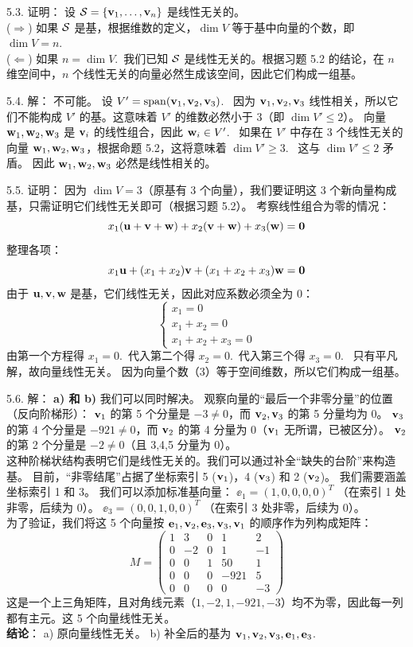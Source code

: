 \begin{exer}
5.3. 证明：
设 $\mathcal{S}  = \{\mathbf{v}_1, \dots, \mathbf{v}_n\}$ 是线性无关的。
\\
($\Rightarrow$) 如果 $\mathcal{S} $ 是基，根据维数的定义，$\dim V$ 等于基中向量的个数，即 $\dim V = n$.~
\\
($\Leftarrow$) 如果 $n = \dim V$.~我们已知 $\mathcal{S} $ 是线性无关的。根据习题 5.2 的结论，在 $n$ 维空间中，$n$ 个线性无关的向量必然生成该空间，因此它们构成一组基。

5.4. 解：
不可能。
设 $V' = \operatorname{span}(\mathbf{v}_1, \mathbf{v}_2, \mathbf{v}_3)$.~
因为 $\mathbf{v}_1, \mathbf{v}_2, \mathbf{v}_3$ 线性相关，所以它们不能构成 $V'$ 的基。这意味着 $V'$ 的维数必然小于 3（即 $\dim V' \le 2$）。
向量 $\mathbf{w}_1, \mathbf{w}_2, \mathbf{w}_3$ 是 $\mathbf{v}_i$ 的线性组合，因此 $\mathbf{w}_i \in V'$.~
如果在 $V'$ 中存在 3 个线性无关的向量 $\mathbf{w}_1, \mathbf{w}_2, \mathbf{w}_3$，根据命题 5.2，这将意味着 $\dim V' \ge 3$.~
这与 $\dim V' \le 2$ 矛盾。
因此 $\mathbf{w}_1, \mathbf{w}_2, \mathbf{w}_3$ 必然是线性相关的。

5.5. 证明：
因为 $\dim V = 3$（原基有 3 个向量），我们要证明这 3 个新向量构成基，只需证明它们线性无关即可（根据习题 5.2）。
考察线性组合为零的情况：
$$ x_1(\mathbf{u}+\mathbf{v}+\mathbf{w}) + x_2(\mathbf{v}+\mathbf{w}) + x_3(\mathbf{w}) = \mathbf{0} $$
整理各项：
$$ x_1 \mathbf{u} + (x_1+x_2) \mathbf{v} + (x_1+x_2+x_3) \mathbf{w} = \mathbf{0} $$
由于 $\mathbf{u}, \mathbf{v}, \mathbf{w}$ 是基，它们线性无关，因此对应系数必须全为 0：
$$ \begin{cases} x_1 = 0 \\ x_1 + x_2 = 0 \\ x_1 + x_2 + x_3 = 0 \end{cases} $$
由第一个方程得 $x_1=0$.~代入第二个得 $x_2=0$.~代入第三个得 $x_3=0$.~
只有平凡解，故向量线性无关。
因为向量个数（3）等于空间维数，所以它们构成一组基。

5.6. 解：
\textbf{a) 和 b)} 我们可以同时解决。
观察向量的“最后一个非零分量”的位置（反向阶梯形）：
$\mathbf{v}_1$ 的第 5 个分量是 $-3 \neq 0$，而 $\mathbf{v}_2, \mathbf{v}_3$ 的第 5 分量均为 0。
$\mathbf{v}_3$ 的第 4 个分量是 $-921 \neq 0$，而 $\mathbf{v}_2$ 的第 4 分量为 0（$\mathbf{v}_1$ 无所谓，已被区分）。
$\mathbf{v}_2$ 的第 2 个分量是 $-2 \neq 0$（且 3,4,5 分量为 0）。
\\
这种阶梯状结构表明它们是线性无关的。我们可以通过补全“缺失的台阶”来构造基。
目前，“非零结尾”占据了坐标索引 5 ($\mathbf{v}_1$)，4 ($\mathbf{v}_3$) 和 2 ($\mathbf{v}_2$)。
我们需要涵盖坐标索引 1 和 3。
我们可以添加标准基向量：
$\ee_1 = (1, 0, 0, 0, 0)^T$ （在索引 1 处非零，后续为 0）。
$\ee_3 = (0, 0, 1, 0, 0)^T$ （在索引 3 处非零，后续为 0）。
\\
为了验证，我们将这 5 个向量按 $\mathbf{e}_1, \mathbf{v}_2, \mathbf{e}_3, \mathbf{v}_3, \mathbf{v}_1$ 的顺序作为列构成矩阵：
$$ M = \begin{pmatrix} 1 & 3 & 0 & 1 & 2 \\ 0 & -2 & 0 & 1 & -1 \\ 0 & 0 & 1 & 50 & 1 \\ 0 & 0 & 0 & -921 & 5 \\ 0 & 0 & 0 & 0 & -3 \end{pmatrix} $$
这是一个上三角矩阵，且对角线元素（$1, -2, 1, -921, -3$）均不为零，因此每一列都有主元。这 5 个向量线性无关。
\\
\textbf{结论}：
a) 原向量线性无关。
b) 补全后的基为 $\mathbf{v}_1, \mathbf{v}_2, \mathbf{v}_3, \mathbf{e}_1, \mathbf{e}_3$.~


\end{exer}
